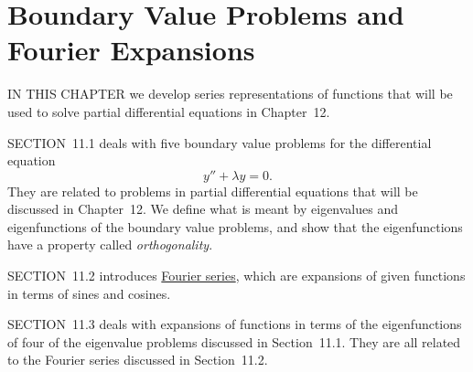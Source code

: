 \chapter{Boundary Value Problems and Fourier Expansions}

\noindent
IN THIS CHAPTER we develop series representations of functions that will be used to solve partial
differential equations in Chapter~12.

\medskip
\noindent
SECTION~11.1 deals with five boundary value problems for the differential equation
\[
  y''+\lambda y=0.
\]
They are related to problems in partial differential equations that will be discussed in Chapter~12.
We define what is meant by eigenvalues and eigenfunctions of the boundary value problems, and show
that the eigenfunctions have a property called {\color{blue}\it orthogonality\/}.

\medskip
\noindent
SECTION~11.2 introduces
\href{https://mathshistory.st-andrews.ac.uk/Biographies/Fourier/}{\color{blue}
Fourier series}, which are expansions of given functions in terms of sines and cosines.

\medskip
\noindent
SECTION~11.3 deals with expansions of functions in terms of the eigenfunctions of four of the
eigenvalue problems discussed in Section~11.1. They are all related to the Fourier series discussed
in Section~11.2.

\newpage






